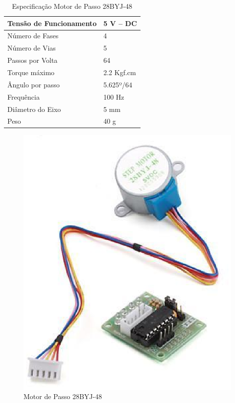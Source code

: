 \begin{table}[h]
\centering
\caption{Especificação Motor de Passo 28BYJ-48}
\label{table3}
\begin{tabular}{|l|l|}
\hline
Tensão de Funcionamento & 5 V – DC   \\ \hline
Número de Fases         & 4          \\ \hline
Número de Vias          & 5          \\ \hline
Passos por Volta        & 64         \\ \hline
Torque máximo           & 2.2 Kgf.cm \\ \hline
Ângulo por passo        & 5.625º/64  \\ \hline
Frequência              & 100 Hz     \\ \hline
Diâmetro do Eixo        & 5 mm       \\ \hline
Peso                    & 40 g       \\ \hline
\end{tabular}
\end{table}

\begin{figure}[h]
	\centering
	\includegraphics[keepaspectratio=true,scale=0.4]{figuras/sensor2.eps}
	\caption{Motor de Passo 28BYJ-48}
	\label{sensor2}
\end{figure}

